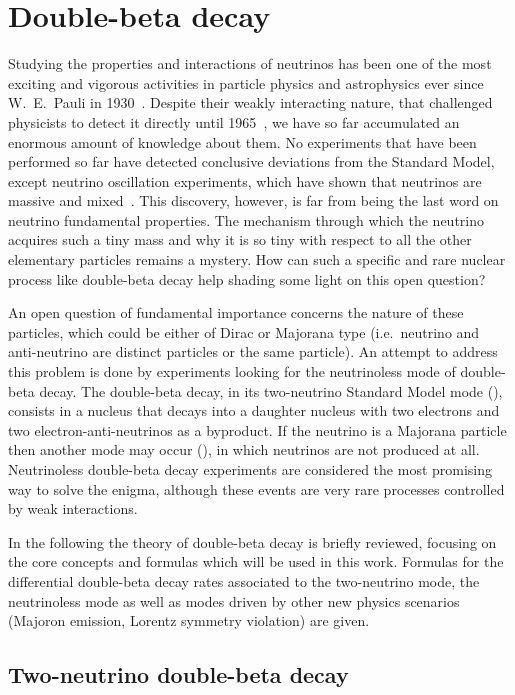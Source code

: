 \chapter{Double-beta decay}\label{chap:theory}

Studying the properties and interactions of neutrinos has been one of the most
exciting and vigorous activities in particle physics and astrophysics ever
since W.~E.~Pauli in 1930~\cite{Brown1978}. Despite their weakly interacting
nature, that challenged physicists to detect it directly until
1965~\cite{Cowan1956}, we have so far accumulated an enormous amount of
knowledge about them. No experiments that have been performed so far have
detected conclusive deviations from the Standard Model, except neutrino
oscillation experiments, which have shown that neutrinos are massive and
mixed~\cite{Fukuda1998, Ahmad2002, Eguchi2003, Kajita2016, McDonald2016}.
This discovery, however, is far from being the last word on neutrino
fundamental properties. The mechanism through which the neutrino acquires such
a tiny mass and why it is so tiny with respect to all the other elementary
particles remains a mystery. How can such a specific and rare nuclear process
like double-beta decay help shading some light on this open question?

An open question of fundamental importance concerns the nature of these
particles, which could be either of Dirac or Majorana type (i.e.~neutrino and
anti-neutrino are distinct particles or the same particle). An attempt to
address this problem is done by experiments looking for the neutrinoless mode
of double-beta decay. The double-beta decay, in its two-neutrino Standard Model
mode (\nnbb), consists in a nucleus that decays into a daughter nucleus with
two electrons and two electron-anti-neutrinos as a byproduct. If the neutrino
is a Majorana particle then another mode may occur (\onbb), in which
neutrinos are not produced at all. Neutrinoless double-beta decay experiments
are considered the most promising way to solve the enigma, although these
events are very rare processes controlled by weak interactions.

In the following the theory of double-beta decay is briefly reviewed, focusing
on the core concepts and formulas which will be used in this work. Formulas for
the differential double-beta decay rates associated to the two-neutrino mode,
the neutrinoless mode as well as modes driven by other new physics scenarios
(Majoron emission, Lorentz symmetry violation) are given.

\section{Two-neutrino double-beta decay}

